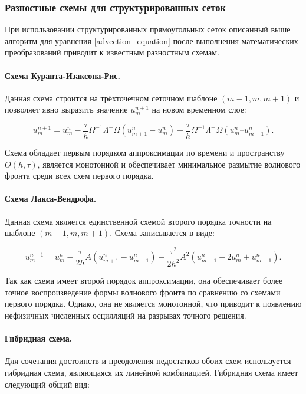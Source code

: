 \subsubsection{Разностные схемы для структурированных сеток}

При использовании структурированных прямоугольных сеток описанный выше алгоритм для уравнения \ref{advection_equation} после выполнения математических преобразований приводит к известным разностным схемам.

\paragraph{Схема Куранта-Изаксона-Рис.} Данная схема строится на трёхточечном сеточном шаблоне $(m-1, m, m+1)$ и позволяет явно выразить значение $u_m^{n+1}$ на новом временном слое:

\begin{equation}
	\label{CIR scheme}
	u^{n+1}_m = u^n_m - \frac{\tau}{h} \Omega^{-1} \Lambda^+ \Omega (u^n_{m+1} - u^n_m) 
	- \frac{\tau}{h} \Omega^{-1} \Lambda^- \Omega (u^n_m – u^n_{m-1}) .
\end{equation}

Схема обладает первым порядком аппроксимации по времени и пространству $O(h, \tau)$, является монотонной и обеспечивает минимальное размытие волнового фронта среди всех схем первого порядка.

\paragraph{Схема Лакса-Вендрофа.} Данная схема является единственной схемой второго порядка точности на шаблоне $(m-1, m, m+1)$. Схема записывается в виде:

\begin{equation}
	\label{LW scheme}
	u^{n+1}_m = u^n_m - \frac{\tau}{2h} A (u^n_{m+1} - u^n_{m-1})
	 - \frac{\tau^2}{2h^2} A^2 (u^n_{m+1} - 2u^n_m + u^n_{m-1}) .
\end{equation}

Так как схема имеет второй порядок аппроксимации, она обеспечивает более точное воспроизведение формы волнового фронта по сравнению со схемами первого порядка. Однако, она не является монотонной, что приводит к появлению нефизичных численных осцилляций на разрывах точного решения.


\paragraph{Гибридная схема.} Для сочетания достоинств и преодоления недостатков обоих схем используется гибридная схема, являющаяся их линейной комбинацией. Гибридная схема имеет следующий общий вид:

